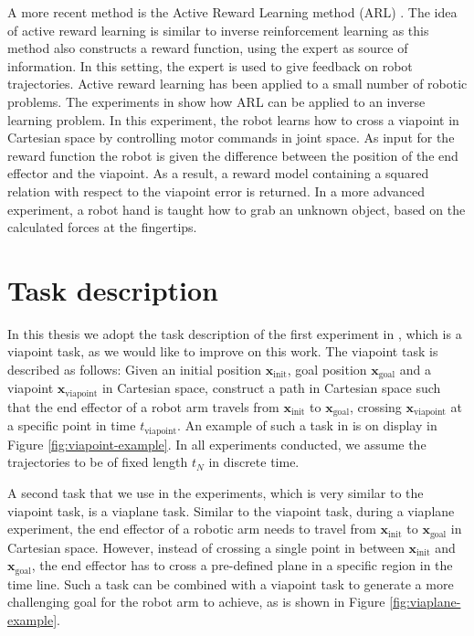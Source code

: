 \documentclass[mscThesis.tex]{subfiles}
\begin{document}
A more recent method is the Active Reward Learning method (ARL) \cite{Daniel2015}. The idea of active reward learning is similar to inverse reinforcement learning as this method also constructs a reward function, using the expert as source of information. In this setting, the expert is used to give feedback on robot trajectories. Active reward learning has been applied to a small number of robotic problems. The experiments in \cite{Daniel2015} show how ARL can be applied to an inverse learning problem. In this experiment, the robot learns how to cross a viapoint in Cartesian space by controlling motor commands in joint space. As input for the reward function the robot is given the difference between the position of the end effector and the viapoint. As a result, a reward model containing a squared relation with respect to the viapoint error is returned. In a more advanced experiment, a robot hand is taught how to grab an unknown object, based on the calculated forces at the fingertips. 

\section{Task description}
In this thesis we adopt the task description of the first experiment in \cite{Daniel2015}, which is a viapoint task, as we would like to improve on this work. The viapoint task is described as follows: Given an initial position $\bm{x}_{\text{init}}$, goal position $\bm{x}_{\text{goal}}$ and a viapoint $\bm{x}_{\text{viapoint}}$ in Cartesian space, construct a path in Cartesian space such that the end effector of a robot arm travels from $\bm{x}_{\text{init}}$ to $\bm{x}_{\text{goal}}$, crossing $\bm{x}_{\text{viapoint}}$ at a specific point in time $t_{\text{viapoint}}$. An example of such a task in is on display in Figure \ref{fig:viapoint-example}. In all experiments conducted, we assume the trajectories to be of fixed length $t_N$ in discrete time.

A second task that we use in the experiments, which is very similar to the viapoint task, is a viaplane task. Similar to the viapoint task, during a viaplane experiment, the end effector of a robotic arm needs to travel from $\bm{x}_{\text{init}}$ to $\bm{x}_{\text{goal}}$ in Cartesian space. However, instead of crossing a single point in between $\bm{x}_{\text{init}}$ and $\bm{x}_{\text{goal}}$, the end effector has to cross a pre-defined plane in a specific region in the time line. Such a task can be combined with a viapoint task to generate a more challenging goal for the robot arm to achieve, as is shown in Figure \ref{fig:viaplane-example}. 
\end{document}
